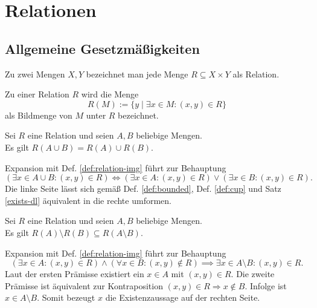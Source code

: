 \newpage
\section{Relationen}

\subsection{Allgemeine Gesetzmäßigkeiten}

\begin{Definition}[Relation]\newlinefirst
Zu zwei Mengen $X,Y$ bezeichnet man
jede Menge $R\subseteq X\times Y$ als Relation.
\end{Definition}
\begin{Definition}[Bildmenge]\label{def:relation-img}
Zu einer Relation $R$ wird die Menge
\[R(M) := \{y\mid\exists x\in M\colon (x,y)\in R\}\]
als Bildmenge von $M$ unter $R$ bezeichnet.
\end{Definition}

\begin{Satz}
Sei $R$ eine Relation und seien $A,B$ beliebige Mengen.\\
Es gilt $R(A\cup B) = R(A)\cup R(B)$.
\end{Satz}
\begin{Beweis}
Expansion mit Def. \ref{def:relation-img} führt zur Behauptung
\[(\exists x\in A\cup B\colon (x,y)\in R) \iff (\exists x\in A\colon (x,y)\in R)
\lor (\exists x\in B\colon (x,y)\in R).\]
Die linke Seite lässt sich gemäß Def. \ref{def:bounded},
Def. \ref{def:cup} und Satz \ref{exists-dl}
äquivalent in die rechte umformen.\;\qedsymbol
\end{Beweis}

\begin{Satz}
Sei $R$ eine Relation und seien $A,B$ beliebige Mengen.\\
Es gilt $R(A)\setminus R(B)\subseteq R(A\setminus B)$.
\end{Satz}
\begin{Beweis}
Expansion mit Def. \ref{def:relation-img} führt zur Behauptung
\[(\exists x\in A\colon (x,y)\in R)\land (\forall x\in B\colon (x,y)\notin R)
\implies \exists x\in A\setminus B\colon (x,y)\in R.\]
Laut der ersten Prämisse existiert ein $x\in A$ mit $(x,y)\in R$. Die
zweite Prämisse ist äquivalent zur Kontraposition $(x,y)\in R\Rightarrow x\notin B$.
Infolge ist $x\in A\setminus B$. Somit bezeugt $x$ die
Existenzaussage auf der rechten Seite.\,\qedsymbol
\end{Beweis}

